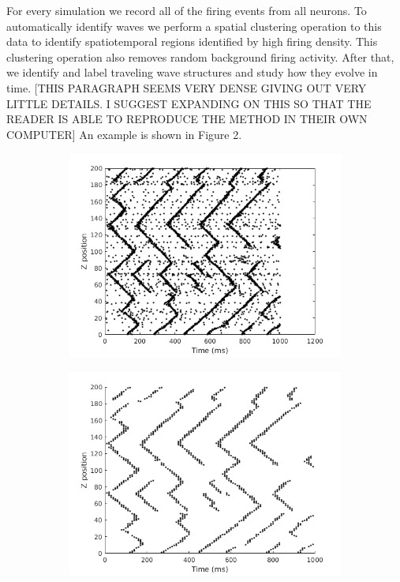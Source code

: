 \documentclass[a4paper,11pt]{article}
\begin{document}
For every simulation we record all of the firing events from all neurons. 
To automatically identify waves we perform a spatial clustering operation to this data to identify spatiotemporal regions identified by high firing density. 
This clustering operation also removes random background firing activity. 
After that, we identify and label traveling wave structures and study how they evolve in time. 
[THIS PARAGRAPH SEEMS VERY DENSE GIVING OUT VERY LITTLE DETAILS. I SUGGEST
EXPANDING ON THIS SO THAT THE READER IS ABLE TO REPRODUCE THE METHOD IN THEIR
OWN COMPUTER] 
An example is shown in Figure 2.
\begin{figure}[!htb]
 \centering
 \begin{subfigure}{0.33\textwidth}
  \centering
  \includegraphics[width=\textwidth]{fig/2x2_firings}
 \end{subfigure}%
 \begin{subfigure}{0.33\textwidth}
  \centering
  \includegraphics[width=\textwidth]{fig/2x2_density_filter}

\end{subfigure}
\end{figure}
\end{document}
